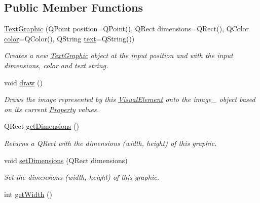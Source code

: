 \subsection*{Public Member Functions}
\begin{DoxyCompactItemize}
\item 
\hyperlink{class_picto_1_1_text_graphic_a6559d12b9757bf011d6d6df199ac1c28}{Text\-Graphic} (Q\-Point position=Q\-Point(), Q\-Rect dimensions=Q\-Rect(), Q\-Color \hyperlink{struct_picto_1_1_visual_element_a45c3042c969717eb2ab60373369c7de7}{color}=Q\-Color(), Q\-String \hyperlink{class_picto_1_1_text_graphic_adccc3ff15e9b3adf58ad589935786bd2}{text}=Q\-String())
\begin{DoxyCompactList}\small\item\em Creates a new \hyperlink{class_picto_1_1_text_graphic}{Text\-Graphic} object at the input position and with the input dimensions, color and text string. \end{DoxyCompactList}\item 
\hypertarget{class_picto_1_1_text_graphic_aeab7d84f82bc312db0cb3fe6396038fc}{void \hyperlink{class_picto_1_1_text_graphic_aeab7d84f82bc312db0cb3fe6396038fc}{draw} ()}\label{class_picto_1_1_text_graphic_aeab7d84f82bc312db0cb3fe6396038fc}

\begin{DoxyCompactList}\small\item\em Draws the image represented by this \hyperlink{struct_picto_1_1_visual_element}{Visual\-Element} onto the image\-\_\- object based on its current \hyperlink{class_picto_1_1_property}{Property} values. \end{DoxyCompactList}\item 
Q\-Rect \hyperlink{class_picto_1_1_text_graphic_a7f998ea8f0b660b6378e496cbe9d3fde}{get\-Dimensions} ()
\begin{DoxyCompactList}\small\item\em Returns a Q\-Rect with the dimensions (width, height) of this graphic. \end{DoxyCompactList}\item 
void \hyperlink{class_picto_1_1_text_graphic_ad72b09ed308727d988aae913e1dae1e6}{set\-Dimensions} (Q\-Rect dimensions)
\begin{DoxyCompactList}\small\item\em Set the dimensions (width, height) of this graphic. \end{DoxyCompactList}\item 
\hypertarget{class_picto_1_1_text_graphic_a9abbb896653bb08ac872a4dbb86f6cc8}{int \hyperlink{class_picto_1_1_text_graphic_a9abbb896653bb08ac872a4dbb86f6cc8}{get\-Width} ()}\label{class_picto_1_1_text_graphic_a9abbb896653bb08ac872a4dbb86f6cc8}


\end{DoxyCompactItemize}
